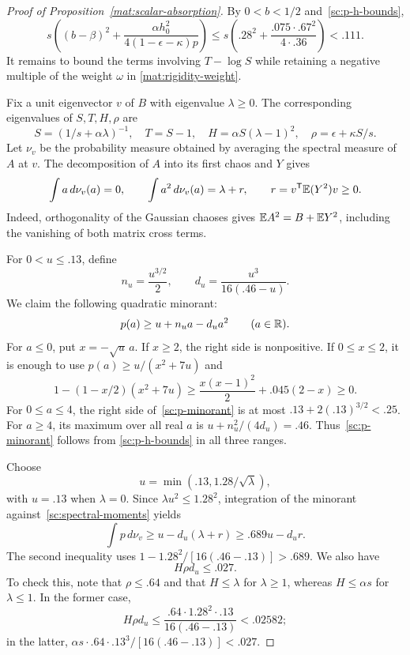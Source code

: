 \begin{proof}[Proof of Proposition~\ref{mat:scalar-absorption}]
By $0<b<1/2$ and~\eqref{sc:p-h-bounds},
\begin{equation}\label{sc:y-cost}
 s\left((b-\beta)^2+
 \frac{\alpha h_0^2}{4(1-\epsilon-\kappa)p}\right)
 \le s\left(.28^2+\frac{.075\cdot .67^2}{4\cdot .36}\right)<.111.
\end{equation}
It remains to bound the terms involving $T-\log S$ while retaining a
negative multiple of the weight $\omega$ in
\eqref{mat:rigidity-weight}.

Fix a unit eigenvector $v$ of $B$ with eigenvalue $\lambda\ge0$.
The corresponding eigenvalues of $S,T,H,\rho$
are
\[
 S=(1/s+\alpha\lambda)^{-1},\quad T=S-1,\quad
 H=\alpha S(\lambda-1)^2,\quad \rho=\epsilon+\kappa S/s.
\]
Let $\nu_v$ be the probability measure obtained by averaging the spectral
measure of $A$ at $v$.  The decomposition of $A$ into its first chaos and
$Y$ gives
\begin{equation}\label{sc:spectral-moments}
 \int a\,d\nu_v(a)=0,\qquad
 \int a^2\,d\nu_v(a)=\lambda+r,
 \qquad r=v^{\mathsf T}\mathbb E(Y^2)v\ge0.
\end{equation}
Indeed, orthogonality of the Gaussian chaoses gives
$\mathbb E A^2=B+\mathbb E Y^2$, including the vanishing of both matrix cross terms.

For $0<u\le.13$, define
\[
 n_u=\frac{u^{3/2}}{2},\qquad
 d_u=\frac{u^3}{16(.46-u)}.
\]
We claim the following quadratic minorant:
\begin{equation}\label{sc:p-minorant}
 p(a)\ge u+n_ua-d_ua^2\qquad(a\in\mathbb R).
\end{equation}
For $a\le0$, put $x=-\sqrt u\,a$.  If $x\ge2$, the right side is
nonpositive.  If $0\le x\le2$, it is enough to use
$p(a)\ge u/(x^2+7u)$ and
\[
 1-(1-x/2)(x^2+7u)
 \ge \frac{x(x-1)^2}{2}+.045(2-x)\ge0.
\]
For $0\le a\le4$, the right side of~\eqref{sc:p-minorant} is at most
$.13+2(.13)^{3/2}<.25$.  For $a\ge4$, its maximum over all real $a$ is
$u+n_u^2/(4d_u)=.46$.  Thus~\eqref{sc:p-minorant} follows from
\eqref{sc:p-h-bounds} in all three ranges.

Choose
\[
 u=\min(.13,1.28/\sqrt\lambda),
\]
with $u=.13$ when $\lambda=0$.  Since $\lambda u^2\le1.28^2$, integration of the
minorant against~\eqref{sc:spectral-moments} yields
\begin{equation}\label{sc:p-mean}
 \int p\,d\nu_v\ge u-d_u(\lambda+r)
 \ge .689u-d_ur.
\end{equation}
The second inequality uses
$1-1.28^2/[16(.46-.13)]>.689$.
We also have
\begin{equation}\label{sc:rho-loss}
 H\rho d_u\le .027.
\end{equation}
To check this, note that $\rho\le.64$ and that $H\le\lambda$ for $\lambda\ge1$,
whereas $H\le\alpha s$ for $\lambda\le1$.  In the former case,
\[
 H\rho d_u\le
 \frac{.64\cdot1.28^2\cdot.13}{16(.46-.13)}<.02582;
\]
in the latter, $\alpha s\cdot.64\cdot .13^3/[16(.46-.13)]<.027$.


\end{proof}
